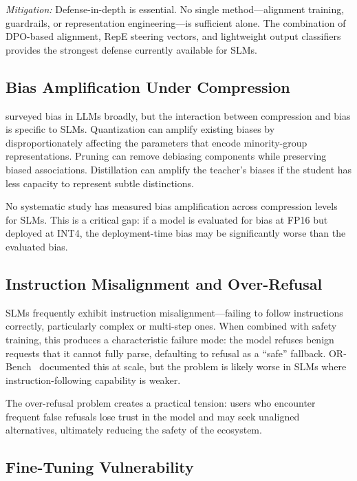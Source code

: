 \documentclass[12pt,a4paper]{article}
\begin{document}
\emph{Mitigation:} Defense-in-depth is essential. No single method---alignment training, guardrails, or representation engineering---is sufficient alone. The combination of DPO-based alignment, RepE steering vectors, and lightweight output classifiers provides the strongest defense currently available for SLMs.

\subsection{Bias Amplification Under Compression}

\citet{gallegos2024bias} surveyed bias in LLMs broadly, but the interaction between compression and bias is specific to SLMs. Quantization can amplify existing biases by disproportionately affecting the parameters that encode minority-group representations. Pruning can remove debiasing components while preserving biased associations. Distillation can amplify the teacher's biases if the student has less capacity to represent subtle distinctions.

No systematic study has measured bias amplification across compression levels for SLMs. This is a critical gap: if a model is evaluated for bias at FP16 but deployed at INT4, the deployment-time bias may be significantly worse than the evaluated bias.

\subsection{Instruction Misalignment and Over-Refusal}

SLMs frequently exhibit instruction misalignment---failing to follow instructions correctly, particularly complex or multi-step ones. When combined with safety training, this produces a characteristic failure mode: the model refuses benign requests that it cannot fully parse, defaulting to refusal as a ``safe'' fallback. OR-Bench~\citep{cui2024orbench} documented this at scale, but the problem is likely worse in SLMs where instruction-following capability is weaker.

The over-refusal problem creates a practical tension: users who encounter frequent false refusals lose trust in the model and may seek unaligned alternatives, ultimately reducing the safety of the ecosystem.

\subsection{Fine-Tuning Vulnerability}
\end{document}
